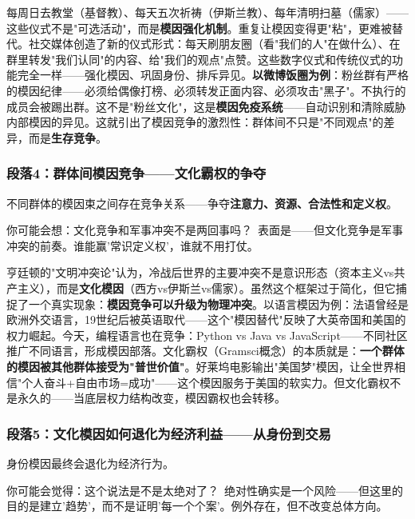 \documentclass[../main.tex]{subfiles}
\begin{document}
每周日去教堂（基督教）、每天五次祈祷（伊斯兰教）、每年清明扫墓（儒家）——这些仪式不是"可选活动"，而是\textbf{模因强化机制}。重复让模因变得更"粘"，更难被替代。社交媒体创造了新的仪式形式：每天刷朋友圈（看"我们的人"在做什么）、在群里转发"我们认同"的内容、给"我们的观点"点赞。这些数字仪式和传统仪式的功能完全一样——强化模因、巩固身份、排斥异见。\textbf{以微博饭圈为例}：粉丝群有严格的模因纪律——必须给偶像打榜、必须转发正面内容、必须攻击"黑子"。不执行的成员会被踢出群。这不是"粉丝文化"，这是\textbf{模因免疫系统}——自动识别和清除威胁内部模因的异见。这就引出了模因竞争的激烈性：群体间不只是"不同观点"的差异，而是\textbf{生存竞争}。

	\subsubsection*{段落4：群体间模因竞争——文化霸权的争夺}

	不同群体的模因束之间存在竞争关系——争夺\textbf{注意力、资源、合法性和定义权}。

	\begin{tcolorbox}[colback=yellow!5, title=\textit{读者行为预测}]

		你可能会想：文化竞争和军事冲突不是两回事吗？\ 表面是——但文化竞争是军事冲突的前奏。谁能赢'常识定义权'，谁就不用打仗。

	\end{tcolorbox}

亨廷顿的"文明冲突论"认为，冷战后世界的主要冲突不是意识形态（资本主义vs共产主义），而是\textbf{文化模因}（西方vs伊斯兰vs儒家）。虽然这个框架过于简化，但它捕捉了一个真实现象：\textbf{模因竞争可以升级为物理冲突}。以语言模因为例：法语曾经是欧洲外交语言，19世纪后被英语取代——这个"模因替代"反映了大英帝国和美国的权力崛起。今天，编程语言也在竞争：Python vs Java vs JavaScript——不同社区推广不同语言，形成模因部落。文化霸权（Gramsci概念）的本质就是：\textbf{一个群体的模因被其他群体接受为"普世价值"}。好莱坞电影输出"美国梦"模因，让全世界相信"个人奋斗+自由市场=成功"——这个模因服务于美国的软实力。但文化霸权不是永久的——当底层权力结构改变，模因霸权也会转移。

	\subsubsection*{段落5：文化模因如何退化为经济利益——从身份到交易}

	身份模因最终会退化为经济行为。

	\begin{tcolorbox}[colback=yellow!5, title=\textit{读者行为预测}]

		你可能会觉得：这个说法是不是太绝对了？\ 绝对性确实是一个风险——但这里的目的是建立'趋势'，而不是证明'每一个个案'。例外存在，但不改变总体方向。

	\end{tcolorbox}
\end{document}
